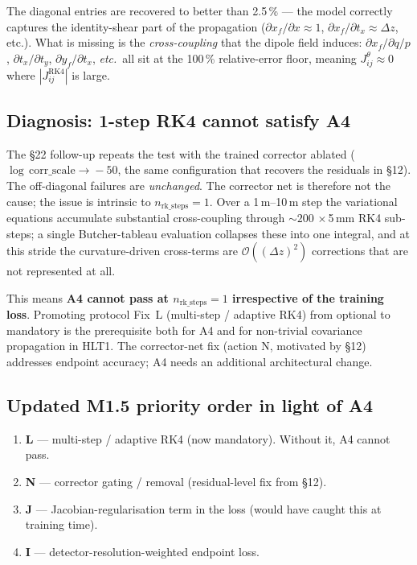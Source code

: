 \documentclass[11pt,a4paper]{article}
\newcommand{\dz}{\ensuremath{\Delta z}}
\newcommand{\qop}{\ensuremath{q/p}}
\begin{document}
\noindent
The diagonal entries are recovered to better than 2.5\,\% — the model
correctly captures the identity-shear part of the propagation
($\partial x_f/\partial x \approx 1$, $\partial x_f/\partial t_x
\approx \dz$, etc.). What is missing is the \emph{cross-coupling} that
the dipole field induces:
\(\partial x_f/\partial\qop\), \(\partial t_x/\partial t_y\),
\(\partial y_f/\partial t_x\), \emph{etc.\,} all sit at the 100\,\%
relative-error floor, meaning \(J^\theta_{ij}\approx 0\) where
\(|J^\mathrm{RK4}_{ij}|\) is large.

\subsection*{Diagnosis: 1-step RK4 cannot satisfy A4}
\label{sec:a4_diagnosis}
The §22 follow-up repeats the test with the trained corrector ablated
(\(\log\,\text{corr\_scale}\!\to\!-50\), the same configuration that
recovers the residuals in §12). The off-diagonal failures are
\emph{unchanged}. The corrector net is therefore not the cause; the
issue is intrinsic to \(n_\mathrm{rk\_steps}=1\). Over a 1\,m--10\,m
step the variational equations accumulate substantial cross-coupling
through ${\sim}200$ ${\times}$\,5\,mm RK4 sub-steps; a single
Butcher-tableau evaluation collapses these into one integral, and at
this stride the curvature-driven cross-terms are
$\mathcal{O}((\dz)^2)$ corrections that are not represented at all.

This means \textbf{A4 cannot pass at $n_\mathrm{rk\_steps}=1$
irrespective of the training loss}. Promoting protocol Fix~L
(multi-step / adaptive RK4) from optional to mandatory is the
prerequisite both for A4 and for non-trivial covariance propagation in
HLT1. The corrector-net fix (action N, motivated by §12) addresses
endpoint accuracy; A4 needs an additional architectural change.

\subsection*{Updated M1.5 priority order in light of A4}
\begin{enumerate}[leftmargin=2em,nosep]
\item \textbf{L} --- multi-step / adaptive RK4 (now mandatory). Without it, A4 cannot pass.
\item \textbf{N} --- corrector gating / removal (residual-level fix from §12).
\item \textbf{J} --- Jacobian-regularisation term in the loss (would have caught this at training time).
\item \textbf{I} --- detector-resolution-weighted endpoint loss.
\end{enumerate}
\end{document}
